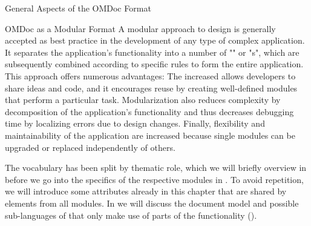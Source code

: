 \begin{tchapter}[id=spec-intro]{General Aspects of the OMDoc Format}
\begin{tsection}[id=modular]{OMDoc as a Modular Format}
  A modular approach to design is generally accepted as best practice in the development
  of any type of complex application. It separates the application's functionality into a
  number of "{}" or "{s}", which are
  subsequently combined according to specific rules to form the entire application. This
  approach offers numerous advantages: The increased {}
  allows developers to share ideas and code, and it encourages reuse by creating
  well-defined modules that perform a particular task. Modularization also reduces
  complexity by decomposition of the application's functionality and thus decreases
  debugging time by localizing errors due to design changes. Finally, flexibility and
  maintainability of the application are increased because single modules can be upgraded
  or replaced independently of others.

  The {\omdoc} vocabulary has been split by thematic role, which we will briefly overview
  in {} before we go into the specifics of the respective modules
  in {}. To avoid repetition, we will introduce some attributes
  already in this chapter that are shared by elements from all modules. In
  {} we will discuss the {\omdoc} document model and possible
  sub-languages of {\omdoc} that only make use of parts of the functionality
  ().


\end{tsection}
\end{tchapter}

